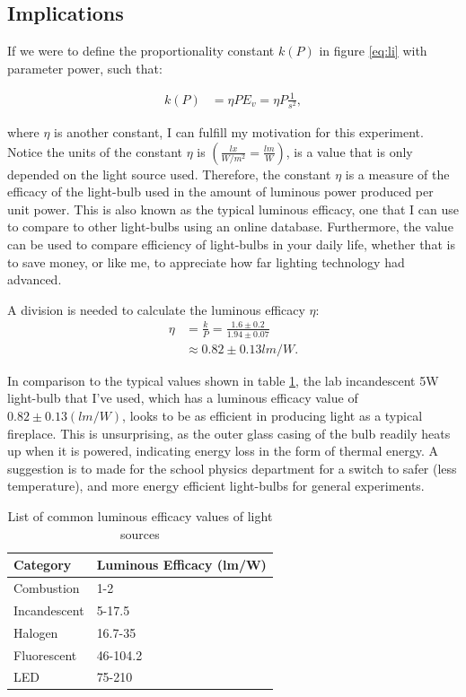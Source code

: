 \documentclass[a4paper,12pt]{article}
\begin{document}
\subsection{Implications}

If we were to define the proportionality constant $k(P)$ in figure \ref{eq:li} with parameter power, such that:

\begin{align*}
    k(P) &= \eta P
    E_v = \eta P \frac{1}{s^2},
\end{align*}

where $\eta$ is another constant, I can fulfill my motivation for this experiment. Notice the units of the constant $\eta$ is $(\frac{\si{lx}}{\si{W\per m^2}} = \frac{\si{lm}}{\si{W}})$, is a value that is only depended on the light source used. Therefore, the constant $\eta$ is a measure of the efficacy of the light-bulb used in the amount of luminous power produced per unit power. This is also known as the typical luminous efficacy, one that I can use to compare to other light-bulbs using an online database. Furthermore, the value can be used to compare efficiency of light-bulbs in your daily life, whether that is to save money, or like me, to appreciate how far lighting technology had advanced.

A division is needed to calculate the luminous efficacy $\eta$:
\begin{align*}
    \eta &= \frac{k}{P} = \frac{1.6 \pm 0.2}{1.94 \pm 0.07}\\
    &\approx 0.82 \pm 0.13 \si{lm\per W}.
\end{align*}

In comparison to the typical values shown in table \ref{tbl:leff}, the lab incandescent 5W light-bulb that I've used, which has a luminous efficacy value of $0.82 \pm 0.13 (\si{lm\per W})$, looks to be as efficient in producing light as a typical fireplace. This is unsurprising, as the outer glass casing of the bulb readily heats up when it is powered, indicating energy loss in the form of thermal energy. A suggestion is to made for the school physics department for a switch to safer (less temperature), and more energy efficient light-bulbs for general experiments.

\begin{table}[H]
    \centering
    \begin{tabular}{l|l}
        Category     & Luminous Efficacy (lm/W) \\ \hline
        Combustion   & 1-2                      \\
        Incandescent & 5-17.5                   \\
        Halogen      & 16.7-35                  \\
        Fluorescent  & 46-104.2                 \\
        LED          & 75-210
    \end{tabular}
    \caption{List of common luminous efficacy values of light sources}
    \label{tbl:leff}
\end{table}
\end{document}
